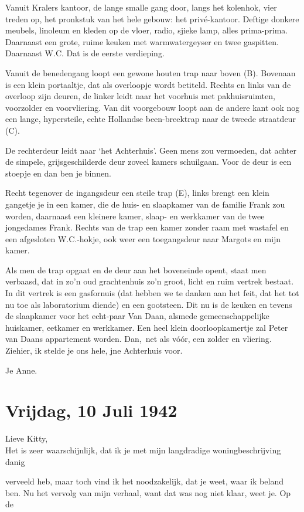 \documentclass{book}
\begin{document}
Vanuit Kralers kantoor, de lange smalle gang door, langs het kolenhok,
vier treden op, het pronkstuk van het hele gebouw: het privé-kantoor.
Deftige donkere meubels, linoleum en kleden op de vloer, radio, sjieke
lamp, alles prima-prima. Daarnaast een grote, ruime keuken met
warmwatergeyser en twee gaspitten. Daarnaast W.C. Dat is de eerste
verdieping.

Vanuit de benedengang loopt een gewone houten trap naar boven (B).
Bovenaan is een klein portaaltje, dat als overloopje wordt betiteld.
Rechts en links van de overloop zijn deuren, de linker leidt naar het
voorhuis met pakhuisruimten, voorzolder en voorvliering. Van dit
voorgebouw loopt aan de andere kant ook nog een lange, hypersteile,
echte Hollandse been-breektrap naar de tweede straatdeur (C).

De rechterdeur leidt naar `het Achterhuis'. Geen mens zou vermoeden, dat
achter de simpele, grijsgeschilderde deur zoveel kamers schuilgaan. Voor
de deur is een stoepje en dan ben je binnen.

Recht tegenover de ingangsdeur een steile trap (E), links brengt een
klein gangetje je in een kamer, die de huis- en slaapkamer van de
familie Frank zou worden, daarnaast een kleinere kamer, slaap- en
werkkamer van de twee jongedames Frank. Rechts van de trap een kamer
zonder raam met wastafel en een afgesloten W.C.-hokje, ook weer een
toegangsdeur naar Margots en mijn kamer.

Als men de trap opgaat en de deur aan het boveneinde opent, staat men
verbaasd, dat in zo'n oud grachtenhuis zo'n groot, licht en ruim vertrek
bestaat. In dit vertrek is een gasfornuis (dat hebben we te danken aan
het feit, dat het tot nu toe als laboratorium diende) en een gootsteen.
Dit nu is de keuken en tevens de slaapkamer voor het echt-paar Van Daan,
alsmede gemeenschappelijke huiskamer, eetkamer en werkkamer. Een heel
klein doorloopkamertje zal Peter van Daans appartement worden. Dan,~net
als vóór, een zolder en vliering. Ziehier, ik stelde je ons hele, jne
Achterhuis voor.

Je Anne.

\chapter{Vrijdag, 10 Juli 1942}

Lieve Kitty,\\Het is zeer waarschijnlijk, dat ik je met mijn langdradige
woningbeschrijving danig

verveeld heb, maar toch vind ik het noodzakelijk, dat je weet, waar ik
beland ben. Nu het vervolg van mijn verhaal, want dat was nog niet
klaar, weet je. Op de
\end{document}
